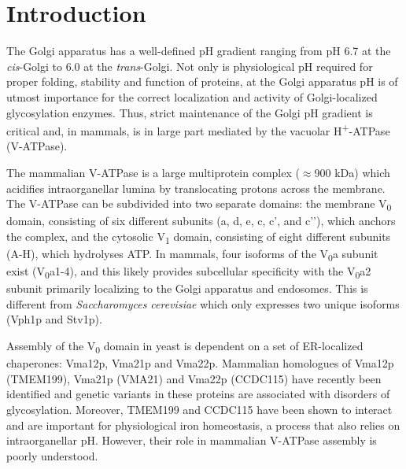 \clearpage

\section{Introduction}

The Golgi apparatus has a well-defined pH gradient\cite{casey_sensors_2010} ranging from pH 6.7 at the \emph{cis}-Golgi to 6.0 at the \emph{trans}-Golgi\cite{casey_sensors_2010,kim_dynamic_1996,schapiro_determinants_2000,paroutis_ph_2004}. Not only is physiological pH required for proper folding, stability and function of proteins, at the Golgi apparatus pH is of utmost importance for the correct localization and activity of Golgi-localized glycosylation enzymes\cite{gawlitzek_ammonium_2000,linders_sugary_2020,fisher_bridging_2016,rivinoja_elevated_2009,maeda_chapter_2010}. Thus, strict maintenance of the Golgi pH gradient is critical and, in mammals, is in large part mediated by the vacuolar H\textsuperscript{+}-ATPase (V-ATPase).

The mammalian V-ATPase is a large multiprotein complex ($\approx$900 kDa) which acidifies intraorganellar lumina by translocating protons across the membrane\cite{forgac_vacuolar_2007,nishi_vacuolar_2002}. The V-ATPase can be subdivided into two separate domains: the membrane V\textsubscript{0} domain, consisting of six different subunits (a, d, e, c, c’, and c’’), which anchors the complex, and the cytosolic V\textsubscript{1} domain, consisting of eight different subunits (A-H), which hydrolyses ATP\cite{nishi_vacuolar_2002}. In mammals, four isoforms of the V\textsubscript{0}a subunit exist (V\textsubscript{0}a1-4), and this likely provides subcellular specificity with the V\textsubscript{0}a2 subunit primarily localizing to the Golgi apparatus and endosomes\cite{sun-wada_direct_2009,toyomura_lysosomes_2003,saw_vacuolar_2011,kornak_impaired_2008,pietrement_distinct_2006,hurtado-lorenzo_v-atpase_2006}. This is different from \emph{Saccharomyces cerevisiae} which only expresses two unique isoforms (Vph1p and Stv1p)\cite{forgac_vacuolar_2007,nishi_vacuolar_2002,kawasaki-nishi_amino-terminal_2001,kawasaki-nishi_yeast_2001,manolson_stv1_1994}.

Assembly of the V\textsubscript{0} domain in yeast is dependent on a set of ER-localized chaperones: Vma12p, Vma21p and Vma22p\cite{forgac_vacuolar_2007,graham_assembly_1998,hill_vma22p_1995,jackson_vma12_1997,malkus_role_2004}. Mammalian homologues of Vma12p (TMEM199), Vma21p (VMA21) and Vma22p (CCDC115) have recently been identified and genetic variants in these proteins are associated with disorders of glycosylation\cite{jansen_tmem199_2016,jansen_ccdc115_2016,cannata_serio_mutations_2020}. Moreover, TMEM199 and CCDC115 have been shown to interact and are important for physiological iron homeostasis, a process that also relies on intraorganellar pH\cite{miles_vacuolar-atpase_2017}. However, their role in mammalian V-ATPase assembly is poorly understood.

